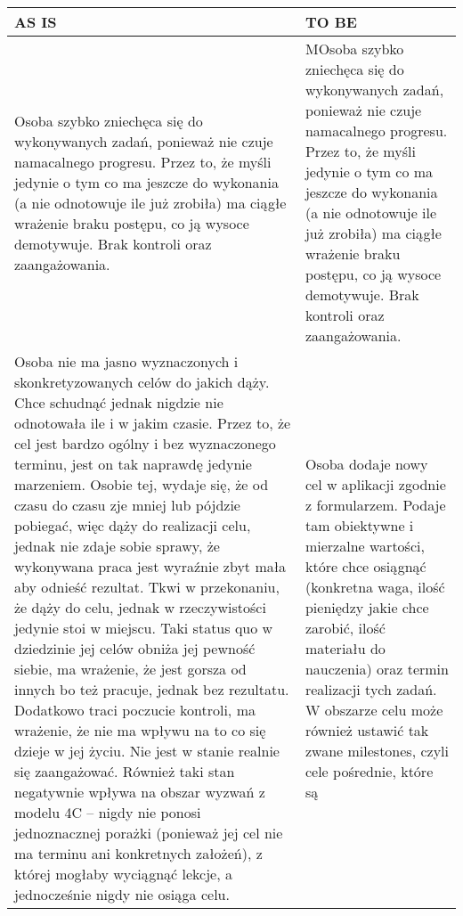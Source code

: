 \documentclass[12pt, letterpaper]{article}
\begin{document}
    \begin{center}
        \begin{longtable}{ | m{} | m{} | }
            \hline
            AS IS & TO BE \\ 
            \hline
            Osoba szybko zniechęca się do wykonywanych zadań, ponieważ nie czuje
            namacalnego progresu. Przez to, że myśli jedynie o tym co ma jeszcze
            do wykonania (a nie odnotowuje ile już zrobiła)  ma ciągłe wrażenie
            braku postępu, co ją wysoce demotywuje. Brak kontroli oraz
            zaangażowania. & MOsoba szybko zniechęca się do wykonywanych zadań,
            ponieważ nie czuje namacalnego progresu. Przez to, że myśli jedynie
            o tym co ma jeszcze do wykonania (a nie odnotowuje ile już zrobiła)
            ma ciągłe wrażenie braku postępu, co ją wysoce demotywuje. Brak
            kontroli oraz zaangażowania. \\
            \hline
            Osoba nie ma jasno wyznaczonych i skonkretyzowanych celów do jakich
            dąży. Chce schudnąć jednak nigdzie nie odnotowała ile i w jakim
            czasie. Przez to, że cel jest bardzo ogólny i bez wyznaczonego
            terminu, jest on tak naprawdę jedynie marzeniem. Osobie tej, wydaje
            się, że od czasu do czasu zje mniej lub pójdzie pobiegać, więc dąży
            do realizacji celu, jednak nie zdaje sobie sprawy, że wykonywana
            praca jest wyraźnie zbyt mała aby odnieść rezultat. Tkwi w
            przekonaniu, że dąży do celu, jednak w rzeczywistości jedynie stoi w
            miejscu. Taki status quo w dziedzinie jej celów obniża jej pewność
            siebie, ma wrażenie, że jest gorsza od innych bo też pracuje, jednak
            bez rezultatu. Dodatkowo traci poczucie kontroli, ma wrażenie, że
            nie ma wpływu na to co się dzieje w jej życiu. Nie jest w stanie
            realnie się zaangażować. Również taki stan negatywnie wpływa na
            obszar wyzwań z modelu 4C – nigdy nie ponosi jednoznacznej porażki
            (ponieważ jej cel nie ma terminu ani konkretnych założeń), z której
            mogłaby wyciągnąć lekcje, a jednocześnie nigdy nie osiąga celu.  &
            Osoba dodaje nowy cel w aplikacji zgodnie z formularzem. Podaje tam
            obiektywne i mierzalne wartości, które chce osiągnąć (konkretna
            waga, ilość pieniędzy jakie chce zarobić, ilość materiału do
            nauczenia) oraz termin realizacji tych zadań. W obszarze celu może
            również ustawić tak zwane milestones, czyli cele pośrednie, które są

\end{longtable}
\end{center}
\end{document}
